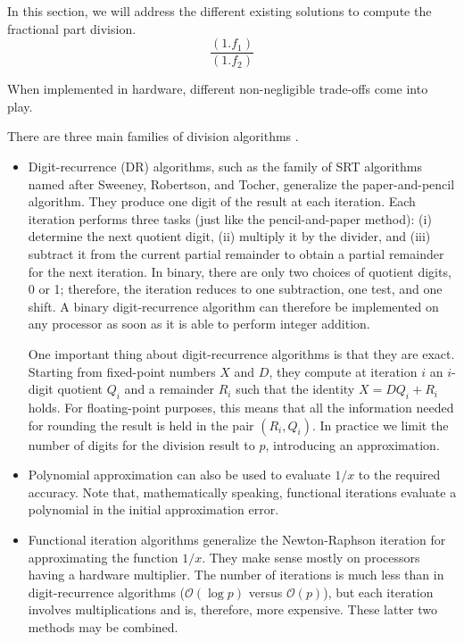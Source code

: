 In this section, we will address the different existing solutions to compute the fractional part division.
\begin{equation}
\frac{(1.f_1)}{(1.f_2)}
\end{equation}

When implemented in hardware, different non-negligible trade-offs come into play.

There are three main families of division algorithms \cite{muller_hardware_2010}. 

\begin{itemize}

\item Digit-recurrence (DR) algorithms, such as the family of SRT algorithms named after Sweeney, Robertson, and Tocher, %
generalize the paper-and-pencil algorithm. They produce one digit of the result at each iteration. Each iteration performs three tasks (just like the pencil-and-paper method): (i) determine the next quotient digit, (ii) multiply it by the divider, and (iii) subtract it from the current partial remainder to obtain a partial remainder for the next iteration.
In binary, there are only two choices of quotient digits, 0 or 1; therefore, the iteration reduces to one subtraction, one test, and one shift. 
A binary digit-recurrence algorithm can therefore be implemented on any processor as soon as it is able to perform integer addition.

One important thing about digit-recurrence algorithms is that they are exact. Starting from fixed-point numbers $X$ and $D$, they compute at iteration $i$ an $i$-digit quotient $Q_i$ and a remainder $R_i$ such that the identity $X = DQ_i + R_i$ holds.
For floating-point purposes, this means that all the information needed for rounding the result is held in the pair $(R_i, Q_i)$. In practice we limit the number of digits for the division result to $p$, introducing an approximation.


\item Polynomial approximation can also be used to evaluate $1/x$ to the required accuracy. %
Note that, mathematically speaking, functional iterations evaluate a polynomial in the initial approximation error. %

\item Functional iteration algorithms generalize the Newton-Raphson iteration for approximating the function $1/x$. They make sense mostly on processors having a hardware multiplier. The number of iterations is much less than in digit-recurrence algorithms ($\mathcal{O}(\log p)$ versus $\mathcal{O}(p)$), but each iteration involves multiplications and is, therefore, more expensive. These latter two methods may be combined.
\end{itemize}

